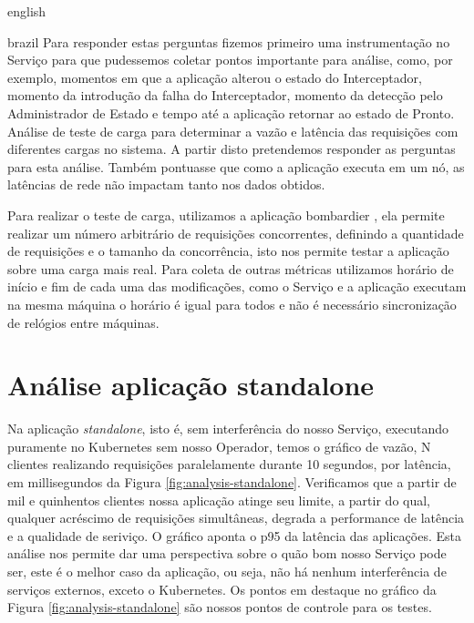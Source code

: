 \begin{otherlanguage*}{english}
\begin{otherlanguage*}{brazil}
Para responder estas perguntas fizemos primeiro uma instrumentação no Serviço para que
pudessemos coletar pontos importante para análise, como, por exemplo, momentos em que a
aplicação alterou o estado do Interceptador, momento da introdução da falha do Interceptador,
momento da detecção pelo Administrador de Estado e tempo até a aplicação retornar ao estado
de Pronto. Análise de teste de carga para determinar a vazão e latência das requisições com
diferentes cargas no sistema. A partir disto pretendemos responder as perguntas para esta
análise. Também pontuasse que como a aplicação executa em um nó, as latências de rede não
impactam tanto nos dados obtidos.

Para realizar o teste de carga, utilizamos a aplicação bombardier \cite{bombardier}, ela
permite realizar um número arbitrário de requisições concorrentes, definindo a quantidade
de requisições e o tamanho da concorrência, isto nos permite testar a aplicação sobre uma
carga mais real. Para coleta de outras métricas utilizamos horário de início e fim de cada
uma das modificações, como o Serviço e a aplicação executam na mesma máquina o horário é
igual para todos e não é necessário sincronização de relógios entre máquinas.

\section{Análise aplicação standalone}

Na aplicação \textit{standalone}, isto é, sem interferência do nosso Serviço, executando
puramente no Kubernetes sem nosso Operador, temos o gráfico de vazão, N clientes realizando
requisições paralelamente durante 10 segundos, por latência, em millisegundos da Figura
\ref{fig:analysis-standalone}. Verificamos que a partir de mil e quinhentos clientes nossa
aplicação atinge seu limite, a partir do qual, qualquer acréscimo de requisições 
simultâneas, degrada a performance de latência e a qualidade de seriviço. O gráfico aponta
o p95 da latência das aplicações. Esta análise nos permite dar uma perspectiva sobre o
quão bom nosso Serviço pode ser, este é o melhor caso da aplicação, ou seja, não há nenhum
interferência de serviços externos, exceto o Kubernetes. Os pontos em destaque no gráfico
da Figura \ref{fig:analysis-standalone} são nossos pontos de controle para os testes.


\end{otherlanguage*}
\end{otherlanguage*}
